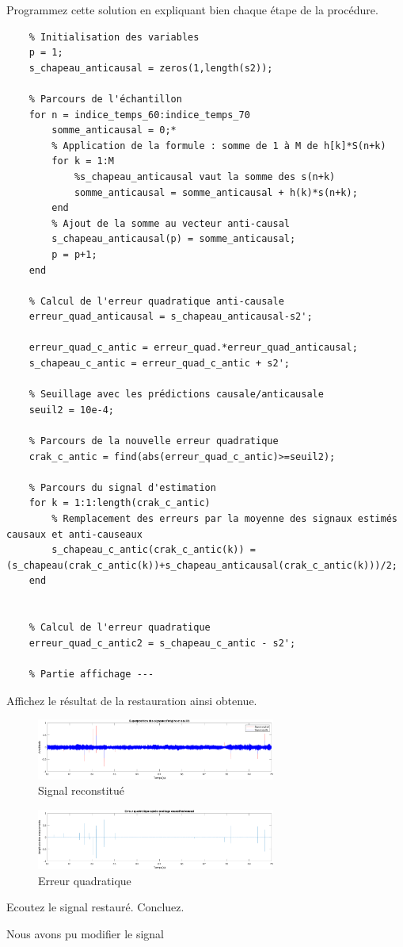 \documentclass{article}
\begin{document}
Programmez cette solution en expliquant bien chaque étape de la procédure. 
\begin{verbatim}
    % Initialisation des variables 
    p = 1;
    s_chapeau_anticausal = zeros(1,length(s2));
    
    % Parcours de l'échantillon 
    for n = indice_temps_60:indice_temps_70
        somme_anticausal = 0;*
        % Application de la formule : somme de 1 à M de h[k]*S(n+k)
        for k = 1:M
            %s_chapeau_anticausal vaut la somme des s(n+k)
            somme_anticausal = somme_anticausal + h(k)*s(n+k);
        end
        % Ajout de la somme au vecteur anti-causal
        s_chapeau_anticausal(p) = somme_anticausal;
        p = p+1;
    end
    
    % Calcul de l'erreur quadratique anti-causale
    erreur_quad_anticausal = s_chapeau_anticausal-s2';
    
    erreur_quad_c_antic = erreur_quad.*erreur_quad_anticausal;
    s_chapeau_c_antic = erreur_quad_c_antic + s2';
    
    % Seuillage avec les prédictions causale/anticausale
    seuil2 = 10e-4;
    
    % Parcours de la nouvelle erreur quadratique 
    crak_c_antic = find(abs(erreur_quad_c_antic)>=seuil2);
    
    % Parcours du signal d'estimation
    for k = 1:1:length(crak_c_antic)
        % Remplacement des erreurs par la moyenne des signaux estimés causaux et anti-causeaux  
        s_chapeau_c_antic(crak_c_antic(k)) = (s_chapeau(crak_c_antic(k))+s_chapeau_anticausal(crak_c_antic(k)))/2;
    end
    
    
    % Calcul de l'erreur quadratique
    erreur_quad_c_antic2 = s_chapeau_c_antic - s2';
    
    % Partie affichage ---
\end{verbatim}

Affichez le résultat de la restauration ainsi obtenue.

\begin{figure}[!h]
    \centering
    \includegraphics[width=0.7\textwidth]{images/partie6_signal.png}
    \caption{Signal reconstitué}
    \label{fig-binaire}
\end{figure}

\begin{figure}[!h]
    \centering
    \includegraphics[width=0.7\textwidth]{images/partie6_err_quad.png}
    \caption{Erreur quadratique}
    \label{fig-binaire}
\end{figure}

Ecoutez le signal restauré. Concluez.

Nous avons pu modifier le signal 
\end{document}
